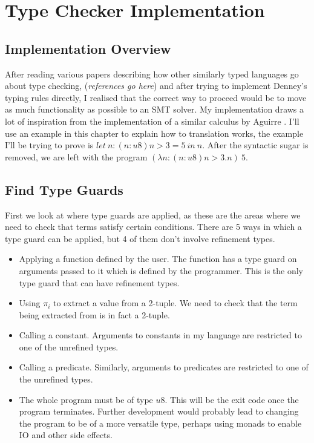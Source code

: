\section{Type Checker Implementation}

\subsection{Implementation Overview}

After reading various papers describing how other similarly typed languages go about type checking,
(\textit{references go here})
and after trying to implement Denney's typing rules directly, I realised that the correct way to
proceed would be to move as much functionality as possible to an SMT solver.
My implementation draws a lot of inspiration from the implementation of a similar calculus by
Aguirre \cite{aguirre16}.
I'll use an example in this chapter to explain how to translation works, the example I'll be
trying to prove is $let\ n: (n:u8) n > 3 = 5\ in\ n$.
After the syntactic sugar is removed, we are left with the program
$(\lambda n: (n:u8) n > 3 . n)\ 5$.

\subsection{Find Type Guards}

First we look at where type guards are applied, as these are the areas where we need to check
that terms satisfy certain conditions.
There are 5 ways in which a type guard can be applied, but 4 of them don't involve refinement types.

\begin{itemize}
    \item Applying a function defined by the user.
    The function has a type guard on arguments passed to it which is defined by the programmer.
    This is the only type guard that can have refinement types.
    \item Using $\pi_i$ to extract a value from a 2-tuple.
    We need to check that the term being extracted from is in fact a 2-tuple.
    \item Calling a constant.
    Arguments to constants in my language are restricted to one of the unrefined types.
    \item Calling a predicate.
    Similarly, arguments to predicates are restricted to one of the unrefined types.
    \item The whole program must be of type $u8$.
    This will be the exit code once the program terminates.
    Further development would probably lead to changing the program to be of a more versatile type,
    perhaps using monads to enable IO and other side effects.
\end{itemize}

